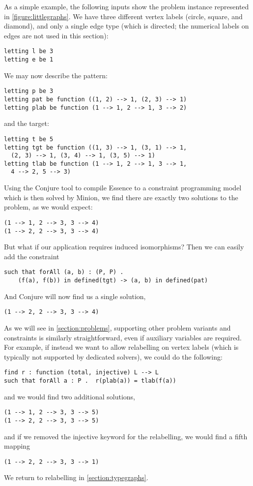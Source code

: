 \documentclass[runningheads]{llncs}
\begin{document}
As a simple example, the following inputs show the problem instance represented in
\cref{figure:littlegraphs}. We have three different vertex labels (circle, square, and diamond), and
only a single edge type (which is directed; the numerical labels on edges are not used in this
section):
\begin{lstlisting}
letting l be 3
letting e be 1
\end{lstlisting}
We may now describe the pattern:
\begin{lstlisting}
letting p be 3
letting pat be function ((1, 2) --> 1, (2, 3) --> 1)
letting plab be function (1 --> 1, 2 --> 1, 3 --> 2)
\end{lstlisting}
and the target:
\begin{lstlisting}
letting t be 5
letting tgt be function ((1, 3) --> 1, (3, 1) --> 1,
  (2, 3) --> 1, (3, 4) --> 1, (3, 5) --> 1)
letting tlab be function (1 --> 1, 2 --> 1, 3 --> 1,
  4 --> 2, 5 --> 3)
\end{lstlisting}
Using the Conjure tool to compile Essence to a constraint programming model which is then solved by
Minion, we find there are exactly two solutions to the problem, as we would expect:
\begin{lstlisting}
(1 --> 1, 2 --> 3, 3 --> 4)
(1 --> 2, 2 --> 3, 3 --> 4)
\end{lstlisting}
But what if our application requires induced isomorphisms? Then we can easily add the constraint
\begin{lstlisting}
such that forAll (a, b) : (P, P) .
    (f(a), f(b)) in defined(tgt) -> (a, b) in defined(pat)
\end{lstlisting}
And Conjure will now find us a single solution,
\begin{lstlisting}
(1 --> 2, 2 --> 3, 3 --> 4)
\end{lstlisting}
As we will see in \cref{section:problems}, supporting other problem variants and constraints is
similarly straightforward, even if auxiliary variables are required. For example, if instead we want
to allow relabelling on vertex labels (which is typically not supported by dedicated solvers), we
could do the following:
\begin{lstlisting}
find r : function (total, injective) L --> L
such that forAll a : P .  r(plab(a)) = tlab(f(a))
\end{lstlisting}
and we would find two additional solutions,
\begin{lstlisting}
(1 --> 1, 2 --> 3, 3 --> 5)
(1 --> 2, 2 --> 3, 3 --> 5)
\end{lstlisting}
and if we removed the injective keyword for the relabelling, we would find a fifth mapping
\begin{lstlisting}
(1 --> 2, 2 --> 3, 3 --> 1)
\end{lstlisting}
We return to relabelling in \cref{section:typegraphs}.
\end{document}
